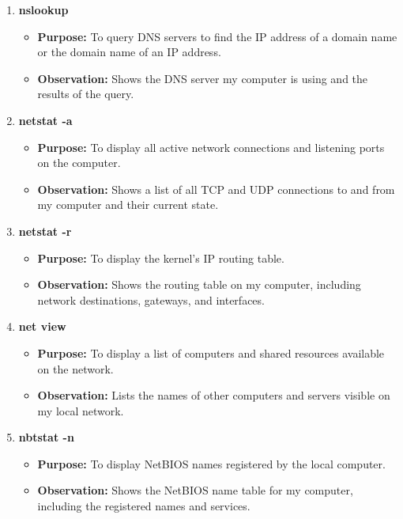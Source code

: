 \documentclass[a4paper,12pt]{article}
\begin{document}
\begin{enumerate}
    \item \textbf{nslookup}
    \begin{itemize}
        \item \textbf{Purpose:} To query DNS servers to find the IP address of a domain name or the domain name of an IP address.
        \item \textbf{Observation:} Shows the DNS server my computer is using and the results of the query.
    \end{itemize}

    \item \textbf{netstat -a}
    \begin{itemize}
        \item \textbf{Purpose:} To display all active network connections and listening ports on the computer.
        \item \textbf{Observation:} Shows a list of all TCP and UDP connections to and from my computer and their current state.
    \end{itemize}

    \item \textbf{netstat -r}
    \begin{itemize}
        \item \textbf{Purpose:} To display the kernel's IP routing table.
        \item \textbf{Observation:} Shows the routing table on my computer, including network destinations, gateways, and interfaces.
    \end{itemize}

    \item \textbf{net view}
    \begin{itemize}
        \item \textbf{Purpose:} To display a list of computers and shared resources available on the network.
        \item \textbf{Observation:} Lists the names of other computers and servers visible on my local network.
    \end{itemize}

    \item \textbf{nbtstat -n}
    \begin{itemize}
        \item \textbf{Purpose:} To display NetBIOS names registered by the local computer.
        \item \textbf{Observation:} Shows the NetBIOS name table for my computer, including the registered names and services.
    \end{itemize}
\end{enumerate}
\end{document}
